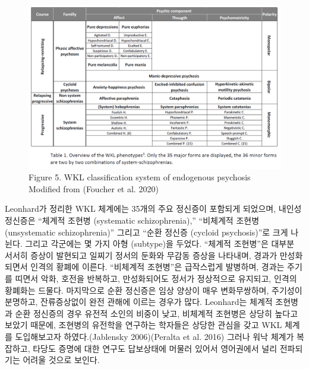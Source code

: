 \documentclass[
]{article}
\begin{document}
\begin{figure}
\hypertarget{fig:WKL}{%
\centering
\includegraphics{images/01-01/img_4.png}
\caption{Figure 5. WKL classification system of endogenous psychosis
Modified from (Foucher et al. 2020)}\label{fig:WKL}
}
\end{figure}

Leonhard가 정리한 WKL 체계에는 35개의 주요 정신증이 포함되게 되었으며,
내인성 정신증은 ``체계적 조현병 (systematic schizophrenia),'' ``비체계적
조현병 (unsystematic schizophrenia)'' 그리고 ``순환 정신증 (cycloid
psychosis)''로 크게 나뉜다. 그리고 각군에는 몇 가지 아형 (subtype)을
두었다. ``체계적 조현병''은 대부분 서서히 증상이 발현되고 일찌기 정서의
둔화와 무감동 증상을 나타내며, 경과가 만성화되면서 인격의 황폐에 이른다.
``비체계적 조현병''은 급작스럽게 발병하며, 경과는 주기를 띠면서 악화,
호전을 반복하고, 만성화되어도 정서가 정상적으로 유지되고, 인격의
황폐화는 드물다. 마지막으로 순환 정신증은 임상 양상이 매우 변화무쌍하며,
주기성이 분명하고, 잔류증상없이 완전 관해에 이르는 경우가 많다.
Leonhard는 체계적 조현병과 순환 정신증의 경우 유전적 소인의 비중이 낮고,
비체계적 조현병은 상당히 높다고 보았기 때문에, 조현병의 유전학을
연구하는 학자들은 상당한 관심을 갖고 WKL 체계를 도입해보고자
하였다.(Jablensky 2006)(Peralta et al. 2016) 그러나 워낙 체계가
복잡하고, 타당도 증명에 대한 연구도 답보상태에 머물러 있어서 영어권에서
널리 전파되기는 어려울 것으로 보인다.
\end{document}
